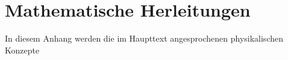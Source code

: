 
\cleardoublepage
\appendix
\setcounter{chapter}{0} %
\renewcommand{\thechapter}{\Alph{chapter}}
\renewcommand{\thesection}{\thechapter.\arabic{section}}
\renewcommand{\thesubsection}{\thesection.\arabic{subsection}}
\renewcommand{\thesubsubsection}{\thesubsection.\arabic{subsubsection}}

\renewcommand{\theHchapter}{app.\Alph{chapter}}
\renewcommand{\theHsection}{\theHchapter.\arabic{section}}
\renewcommand{\theHsubsection}{\theHsection.\arabic{subsection}}
\renewcommand{\theHsubsubsection}{\theHsubsection.\arabic{subsubsection}}
\chapter{Mathematische Herleitungen}
\label{app:mathematische-herleitungen}

In diesem Anhang werden die im Haupttext angesprochenen physikalischen Konzepte





